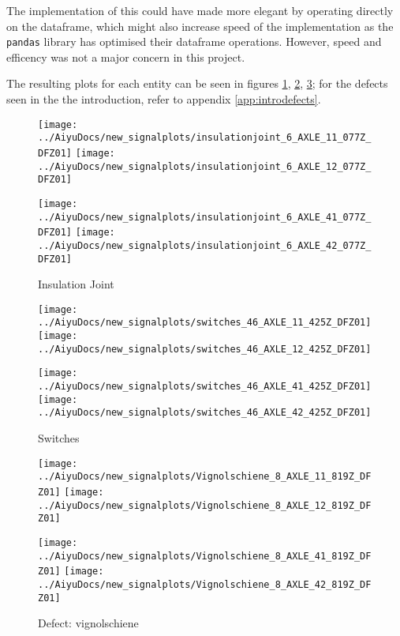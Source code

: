 The implementation of this could have made more elegant by operating directly on the dataframe, which might also increase speed of the implementation as the \verb|pandas| library has optimised their dataframe operations. However, speed and efficency was not a major concern in this project. 

The resulting plots for each entity can be seen in figures \ref{fig:insjoint}, \ref{fig:switches}, \ref{fig:defects}; for the defects seen in the the introduction, refer to appendix \ref{app:introdefects}.
\begin{figure}[H]
	\centering
	\texttt{[image: ../AiyuDocs/new\_signalplots/insulationjoint\_6\_AXLE\_11\_077Z\_DFZ01]}
	\texttt{[image: ../AiyuDocs/new\_signalplots/insulationjoint\_6\_AXLE\_12\_077Z\_DFZ01]}
	
	\texttt{[image: ../AiyuDocs/new\_signalplots/insulationjoint\_6\_AXLE\_41\_077Z\_DFZ01]}
	\texttt{[image: ../AiyuDocs/new\_signalplots/insulationjoint\_6\_AXLE\_42\_077Z\_DFZ01]}
	\caption{Insulation Joint}
	\label{fig:insjoint}
\end{figure}

\begin{figure}[H]
	\centering
	\texttt{[image: ../AiyuDocs/new\_signalplots/switches\_46\_AXLE\_11\_425Z\_DFZ01]}
	\texttt{[image: ../AiyuDocs/new\_signalplots/switches\_46\_AXLE\_12\_425Z\_DFZ01]}
	
	\texttt{[image: ../AiyuDocs/new\_signalplots/switches\_46\_AXLE\_41\_425Z\_DFZ01]}
	\texttt{[image: ../AiyuDocs/new\_signalplots/switches\_46\_AXLE\_42\_425Z\_DFZ01]}
	\caption{Switches}
	\label{fig:switches}
\end{figure}

\begin{figure}[H]
	\centering
	\texttt{[image: ../AiyuDocs/new\_signalplots/Vignolschiene\_8\_AXLE\_11\_819Z\_DFZ01]}
	\texttt{[image: ../AiyuDocs/new\_signalplots/Vignolschiene\_8\_AXLE\_12\_819Z\_DFZ01]}
	
	\texttt{[image: ../AiyuDocs/new\_signalplots/Vignolschiene\_8\_AXLE\_41\_819Z\_DFZ01]}
	\texttt{[image: ../AiyuDocs/new\_signalplots/Vignolschiene\_8\_AXLE\_42\_819Z\_DFZ01]}
	\caption{Defect: vignolschiene}
	\label{fig:defects}
\end{figure}


